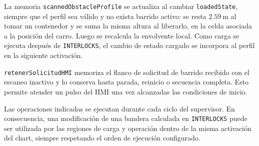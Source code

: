 \documentclass[a4paper,10pt,onecolumn,journal]{ieeeconf}
\numberwithin{equation}{section}
\begin{document}
La memoria \texttt{scannedObstacleProfile} se actualiza al cambiar \texttt{loadedState}, siempre que el perfil sea válido y no exista barrido activo: se resta $2.59~\mathrm{m}$ al tomar un contenedor y se suma la misma altura al liberarlo, en la celda asociada a la posición del carro. Luego se recalcula la envolvente local. Como carga se ejecuta después de \texttt{INTERLOCKS}, el cambio de estado cargado se incorpora al perfil en la siguiente activación.

\texttt{retenerSolicitudHMI} memoriza el flanco de solicitud de barrido recibido con el escaneo inactivo y lo conserva hasta parada, reinicio o secuencia completa. Esto permite atender un pulso del HMI una vez alcanzadas las condiciones de inicio.

Las operaciones indicadas se ejecutan durante cada ciclo del supervisor. En consecuencia, una modificación de una bandera calculada en \texttt{INTERLOCKS} puede ser utilizada por las regiones de carga y operación dentro de la misma activación del chart, siempre respetando el orden de ejecución configurado.


\FloatBarrier
{}
\end{document}
